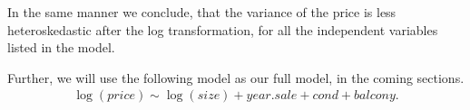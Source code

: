 In the same manner we conclude, that the variance of the price is less heteroskedastic after the log transformation, for all the independent variables listed in the model.

Further, we will use the following model as our full model, in the coming sections.
\begin{align*}
    \log(price) \sim \log(size) + year.sale + \textit{cond} +  \textit{balcony}.
\end{align*}

